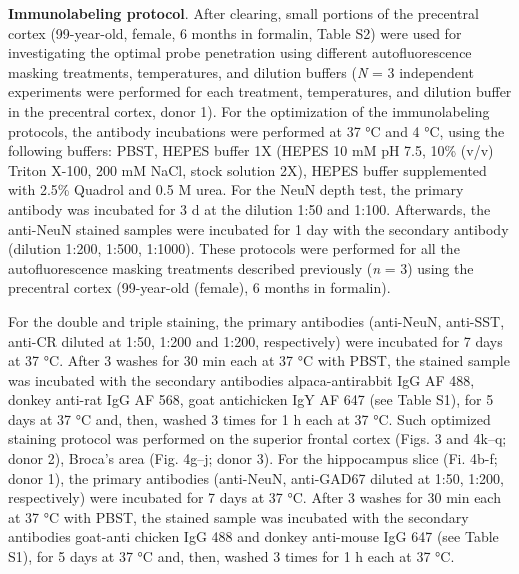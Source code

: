 \documentclass{article}
\begin{document}
\textbf{Immunolabeling protocol}. After clearing, small portions of the precentral cortex (99-year-old, female, 6 months in formalin, Table S2) were used for investigating the optimal probe penetration using different autofluorescence masking treatments, temperatures, and dilution buffers (\emph{N} = 3 independent experiments were performed for each treatment, temperatures, and dilution buffer in the precentral cortex, donor 1). For the optimization of the immunolabeling protocols, the antibody incubations were performed at 37 °C and 4 °C, using the following buffers: PBST, HEPES buffer 1X (HEPES 10 mM pH 7.5, 10\% (v/v) Triton X-100, 200 mM NaCl, stock solution 2X), HEPES buffer supplemented with 2.5\% Quadrol and 0.5 M urea. For the NeuN depth test, the primary antibody was incubated for 3 d at the dilution 1:50 and 1:100. Afterwards, the anti-NeuN stained samples were incubated for 1 day with the secondary antibody (dilution 1:200, 1:500, 1:1000). These protocols were performed for all the autofluorescence masking treatments described previously (\emph{n} = 3) using the precentral cortex (99-year-old (female), 6 months in formalin).

For the double and triple staining, the primary antibodies (anti-NeuN, anti-SST, anti-CR diluted at 1:50, 1:200 and 1:200, respectively) were incubated for 7 days at 37 °C. After 3 washes for 30 min each at 37 °C with PBST, the stained sample was incubated with the secondary antibodies alpaca-antirabbit IgG AF 488, donkey anti-rat IgG AF 568, goat antichicken IgY AF 647 (see Table S1), for 5 days at 37 °C and, then, washed 3 times for 1 h each at 37 °C. Such optimized staining protocol was performed on the superior frontal cortex (Figs. 3 and 4k–q; donor 2), Broca’s area (Fig. 4g–j; donor 3). For the hippocampus slice (Fi. 4b-f; donor 1), the primary antibodies (anti-NeuN, anti-GAD67 diluted at 1:50, 1:200, respectively) were incubated for 7 days at 37 °C. After 3 washes for 30 min each at 37 °C with PBST, the stained sample was incubated with the secondary antibodies goat-anti chicken IgG 488 and donkey anti-mouse IgG 647 (see Table S1), for 5 days at 37 °C and, then, washed 3 times for 1 h each at 37 °C.
\end{document}

